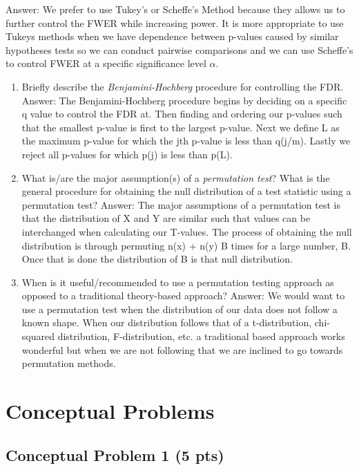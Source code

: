\documentclass[
]{article}
\begin{document}
Answer: We prefer to use Tukey's or Scheffe's Method because they allows
us to further control the FWER while increasing power. It is more
appropriate to use Tukeys methods when we have dependence between
p-values caused by similar hypotheses tests so we can conduct pairwise
comparisons and we can use Scheffe's to control FWER at a specific
significance level \(\alpha\).

\begin{enumerate}
\def\labelenumi{\arabic{enumi}.}
\setcounter{enumi}{7}
\item
  Briefly describe the \emph{Benjamini-Hochberg} procedure for
  controlling the FDR. Answer: The Benjamini-Hochberg procedure begins
  by deciding on a specific q value to control the FDR at. Then finding
  and ordering our p-values such that the smallest p-value is first to
  the largest p-value. Next we define L as the maximum p-value for which
  the jth p-value is less than q(j/m). Lastly we reject all p-values for
  which p(j) is less than p(L).
\item
  What is/are the major assumption(s) of a \emph{permutation test}? What
  is the general procedure for obtaining the null distribution of a test
  statistic using a permutation test? Answer: The major assumptions of a
  permutation test is that the distribution of X and Y are similar such
  that values can be interchanged when calculating our T-values. The
  process of obtaining the null distribution is through permuting n(x) +
  n(y) B times for a large number, B. Once that is done the distribution
  of B is that null distribution.
\item
  When is it useful/recommended to use a permutation testing approach as
  opposed to a traditional theory-based approach? Answer: We would want
  to use a permutation test when the distribution of our data does not
  follow a known shape. When our distribution follows that of a
  t-distribution, chi-squared distribution, F-distribution, etc. a
  traditional based approach works wonderful but when we are not
  following that we are inclined to go towards permutation methods.
\end{enumerate}

\hypertarget{conceptual-problems}{%
\section{Conceptual Problems}\label{conceptual-problems}}

\hypertarget{conceptual-problem-1-5-pts}{%
\subsection{Conceptual Problem 1 (5
pts)}\label{conceptual-problem-1-5-pts}}
\end{document}
